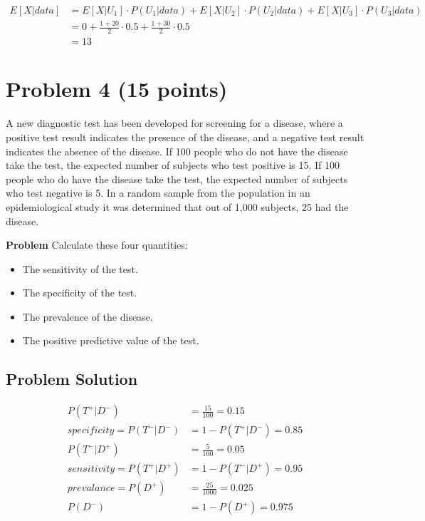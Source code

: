 \documentclass[12pt]{article}
\theoremstyle{definition}
\begin{document}
\begin{align*}
E[X|data] &= E[X|U_1] \cdot P(U_1|data) + E[X|U_2] \cdot P(U_2|data) + E[X|U_3] \cdot P(U_3|data)\\
&= 0 +  \frac{1 + 20}{2} \cdot 0.5 +  \frac{1 + 30}{2} \cdot 0.5\\
&= 13
\end{align*}











\newpage
\section*{Problem 4 (15 points)}

A new diagnostic test has been developed for screening for a disease, where a positive test result indicates the presence of the disease, and a negative test result indicates the absence of the disease. If 100 people who do not have the disease take the test, the expected number of subjects who test positive is 15. If 100 people who do have the disease take the test, the expected number of subjects who test negative is 5. In a random sample from the population in an epidemiological study it was determined that out of 1,000 subjects, 25 had the disease.

\bigskip
\noindent
{\bf Problem} Calculate these four quantities:
\begin{itemize}
	\item The sensitivity of the test.
	\item The specificity of the test.
	\item The prevalence of the disease.
	\item The positive predictive value of the test.
\end{itemize}

\subsection*{Problem Solution}
\begin{align*}
P(T^+|D^-) &= \frac{15}{100} = 0.15\\
specificity = P(T^-|D^-) &= 1 - P(T^+|D^-) = 0.85\\
P(T^-|D^+) &= \frac{5}{100} = 0.05\\
sensitivity = P(T^+|D^+) &= 1 - P(T^-|D^+) = 0.95\\
prevalance = P(D^+) &= \frac{25}{1000} = 0.025\\
P(D^-) &= 1 - P(D^+) = 0.975\\
\end{align*}
\end{document}

